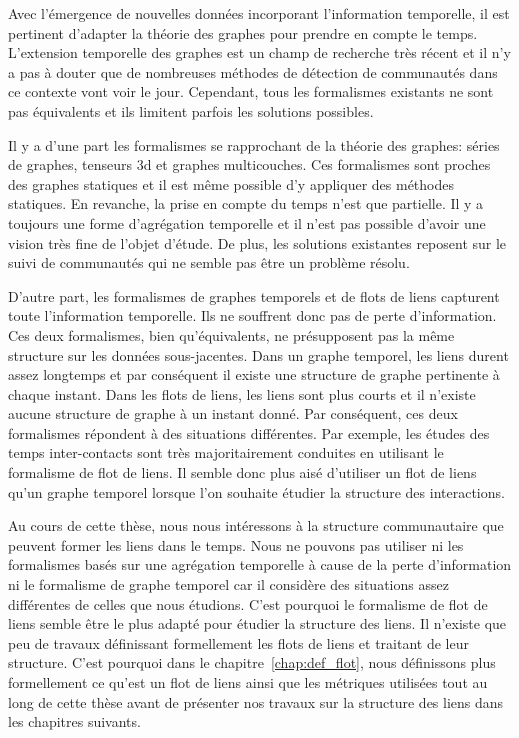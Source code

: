 Avec l'émergence de nouvelles données incorporant l'information temporelle, il est pertinent d'adapter la théorie des graphes pour prendre en compte le temps.
L'extension temporelle des graphes est un champ de recherche très récent et il n'y a pas à douter que de nombreuses méthodes de détection de communautés dans ce contexte vont voir le jour.
Cependant, tous les formalismes existants ne sont pas équivalents et ils limitent parfois les solutions possibles.


Il y a d'une part les formalismes se rapprochant de la théorie des graphes: séries de graphes, tenseurs 3d et graphes multicouches.
Ces formalismes sont proches des graphes statiques et il est même possible d'y appliquer des méthodes statiques.
En revanche, la prise en compte du temps n'est que partielle.
Il y a toujours une forme d'agrégation temporelle et il n'est pas possible d'avoir une vision très fine de l'objet d'étude.
De plus, les solutions existantes reposent sur le suivi de communautés qui ne semble pas être un problème résolu.


D'autre part, les formalismes de graphes temporels et de flots de liens capturent toute l'information temporelle.
Ils ne souffrent donc pas de perte d'information.
Ces deux formalismes, bien qu'équivalents, ne présupposent pas la même structure sur les données sous-jacentes.
Dans un graphe temporel, les liens durent assez longtemps et par conséquent il existe une structure de graphe pertinente à chaque instant.
Dans les flots de liens, les liens sont plus courts et il n'existe aucune structure de graphe à un instant donné.
Par conséquent, ces deux formalismes répondent à des situations différentes.
Par exemple, les études des temps inter-contacts sont très majoritairement conduites en utilisant le formalisme de flot de liens.
Il semble donc plus aisé d'utiliser un flot de liens qu'un graphe temporel lorsque l'on souhaite étudier la structure des interactions.



Au cours de cette thèse, nous nous intéressons à la structure communautaire que peuvent former les liens dans le temps.
Nous ne pouvons pas utiliser ni les formalismes basés sur une agrégation temporelle à cause de la perte d'information ni le formalisme de graphe temporel car il considère des situations assez différentes de celles que nous étudions.
C'est pourquoi le formalisme de flot de liens semble être le plus adapté pour étudier la structure des liens.
Il n'existe que peu de travaux définissant formellement les flots de liens et traitant de leur structure.
C'est pourquoi dans le chapitre~\ref{chap:def_flot}, nous définissons plus formellement ce qu'est un flot de liens ainsi que les métriques utilisées tout au long de cette thèse avant de présenter nos travaux sur la structure des liens dans les chapitres suivants.


